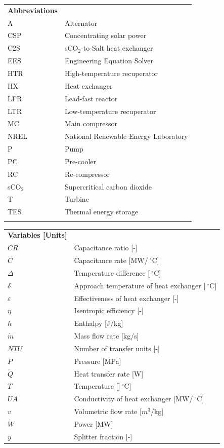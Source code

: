 \documentclass[sustainability,article,accept,moreauthors,pdftex]{Definitions/mdpi}
\begin{document}
\begin{paracol}{2}
{\noindent 
\begin{tabular}{@{}ll}
\textbf{Abbreviations}\\
A & Alternator\\
CSP & Concentrating solar power\\
C2S & sCO$_2$-to-Salt heat exchanger\\
EES & Engineering Equation Solver\\
HTR & High-temperature recuperator\\
HX & Heat exchanger\\
LFR & Lead-fast reactor\\
LTR & Low-temperature recuperator\\
MC & Main compressor\\
NREL & National Renewable Energy Laboratory\\
P & Pump\\
PC & Pre-cooler\\
RC & Re-compressor\\
sCO$_2$ & Supercritical carbon dioxide\\
T & Turbine\\
TES & Thermal energy storage\\

 \\
\end{tabular}


\noindent 
\begin{tabular}{@{}ll}
\textbf{Variables [Units]}\\
$CR$ & Capacitance ratio [-]\\
$\dot{C}$ & Capacitance rate [MW/$~^{\circ}$C]\\
$\Delta$ & Temperature difference [$~^{\circ}$C]\\
$\delta$ & Approach temperature of heat exchanger [$~^{\circ}$C]\\
$\varepsilon$ & Effectiveness of heat exchanger [-]\\
$\eta$ & Isentropic efficiency [-]\\
$h$ & Enthalpy [J/kg]\\
$\dot{m}$ & Mass flow rate [kg/s]\\
$NTU$ & Number of transfer units [-]\\
$P$ & Pressure [MPa]\\
$\dot{Q}$ & Heat transfer rate [W]\\
$T$ & Temperature []$~^{\circ}$C]\\
$UA$ & Conductivity of heat exchanger [MW/$~^{\circ}$C]\\
$v$ & Volumetric flow rate [$m^3$/kg]\\
$\dot{W}$ & Power [MW]\\
$y$ & Splitter fraction [-]\\
\end{tabular}%
}



\end{paracol}
\end{document}
